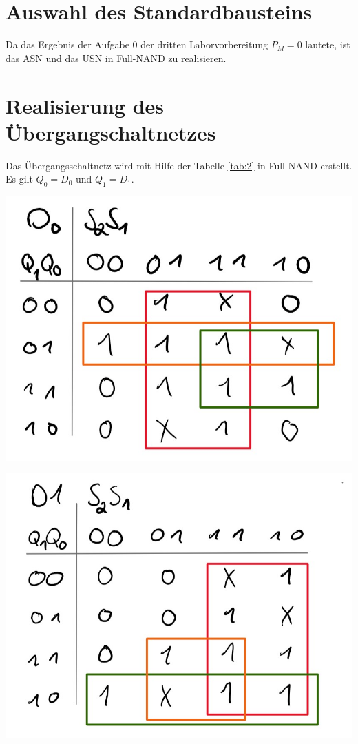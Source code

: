 \documentclass[
    paper=a4,
]{scrartcl}
\begin{document}
\section{Auswahl des Standardbausteins}
    Da das Ergebnis der Aufgabe 0 der dritten Laborvorbereitung \(P_M=0\) lautete, ist das ASN und das ÜSN in Full-NAND zu realisieren.

\section{Realisierung des Übergangschaltnetzes}
    Das Übergangsschaltnetz wird mit Hilfe der Tabelle \ref{tab:2} in Full-NAND erstellt. Es gilt \(Q_0=D_0\) und \(Q_1=D_1\).
    
    \begin{minipage}{0.5\textwidth}
        \centering
            \includegraphics[width=1\textwidth]{usn1.jpg}
            \label{tab:3}    
    \end{minipage}\hfill%
    \begin{minipage}{0.5\textwidth}
        \label{tab:4}
        \includegraphics[width=1\textwidth]{usn2.jpg}
    \end{minipage}
\end{document}
